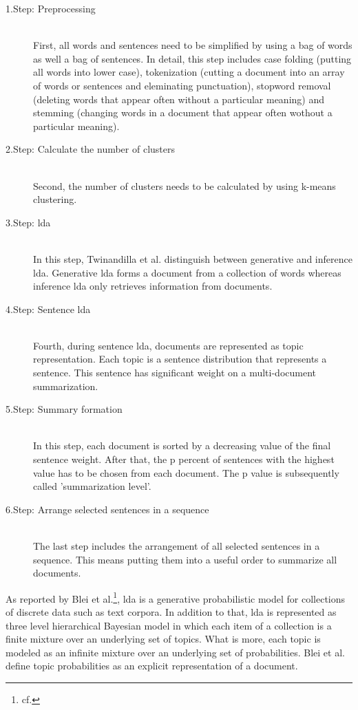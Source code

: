 \begin{description}
\item[1.Step: Preprocessing]\hfill \\
First, all words and sentences need to be simplified by using a bag of words as well a bag of sentences. In detail, this step includes case folding (putting all words into lower case), tokenization (cutting a document into an array of words or sentences and eleminating punctuation), stopword removal (deleting words that appear often without a particular meaning) and stemming (changing words in a document that appear often wothout a particular meaning).

\item[2.Step: Calculate the number of clusters]\hfill \\
Second, the number of clusters needs to be calculated by using k-means clustering. 

\item[3.Step: \gls{lda}]\hfill \\
In this step, Twinandilla et al. distinguish between generative and inference \gls{lda}. Generative \gls{lda} forms a document from a collection of words whereas inference \gls{lda} only retrieves information from documents.

\item[4.Step: Sentence \gls{lda}]\hfill \\
Fourth, during sentence \gls{lda}, documents are represented as topic representation. Each topic is a sentence distribution that represents a sentence. This sentence has significant weight on a multi-document summarization.

\item[5.Step: Summary formation]\hfill \\
In this step, each document is sorted by a decreasing value of the final sentence weight. After that, the p percent of sentences with the highest value has to be chosen from each document. The p value is subsequently called 'summarization level'.

\item[6.Step: Arrange selected sentences in a sequence]\hfill \\
The last step includes the arrangement of all selected sentences in a sequence. This means putting them into a useful order to summarize all documents.
\end{description}

As reported by Blei et al.\footnote{cf.\autocite{blei_2003}}, \gls{lda} is a generative probabilistic model for collections of discrete data such as text corpora. In addition to that, \gls{lda} is represented as three level hierarchical Bayesian model in which each item of a collection is a finite mixture over an underlying set of topics. What is more, each topic is modeled as an infinite mixture over an underlying set of probabilities. Blei et al. define topic probabilities as an explicit representation of a document.

